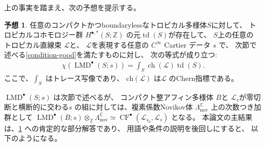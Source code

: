 \documentclass[uplatex,dvipdfmx,12pt]{jsarticle}
\numberwithin{equation}{section}
\theoremstyle{definition}
\newtheorem{conjecture}[theorem]{予想}
\newcommand{\opn}[1]{\operatorname{#1}}
\begin{document}

上の事実を踏まえ、次の予想を提示する。

\begin{conjecture} \label{conjecture-mirror-tropical-rr}
任意のコンパクトかつboundarylessなトロピカル多様体$S$に対して、
トロピカルコホモロジー群 $H^{\bullet,*}(S;\mathbb{Z})$
の元$\opn{td}(S)$が存在して、
$S$上の任意の
トロピカル直線束
$\mathcal{L}$と、
$\mathcal{L}$を表現する任意の
$C^{\infty}$ Cartier データ $s$ で、
次節で述べる\cref{condition-good}を満たすものに対し、
次の等式が成り立つ:
\begin{align}
\chi(\opn{LMD}^{\bullet}(S;s))=
\int_{S}\opn{ch}(\mathcal{L})\opn{td}(S).
\end{align}
ここで、$\int_S$ はトレース写像であり、
$\mathrm{ch}(\mathcal{L})$ は$\mathcal{L}$ のChern指標である。
\end{conjecture}

$\opn{LMD}^{\bullet}(S;s)$ は次節で述べるが、
コンパクト整アフィン多様体 $B$と
$\mathscr{L}_s$が零切断と横断的に交わる$s$
の組に対しては、複素係数Novikov体 
$\Lambda^{\mathbb{C}}_{\mathrm{nov}}$
上の次数つき加群として
$\opn{LMD}^{\bullet}(B;s)\otimes_{\mathbb{Z}}
\Lambda^{\mathbb{C}}_{\mathrm{nov}}\simeq
\opn{CF}^{\bullet}(\mathscr{L}_{s_0},
\mathscr{L}_s)$ となる。
本論文の主結果は、\cref{conjecture-mirror-tropical-rr}
への肯定的な部分解答であり、
用語や条件の説明を後回しにすると、
以下のようになる。
\end{document}
